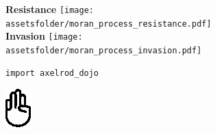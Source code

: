 \documentclass{beamer}
\newcommand{\assetsfolder}{./assets}
\newcommand{\researchfolder}{$HOME/rsc/axelrod-moran}
\newcommand{\mlresearchfolder}{$HOME/rsc/ml-paper}
\begin{document}


\begin{frame}
    \begin{center}
        \scalebox{.6}{}
    \end{center}
\end{frame}


\begin{frame}

    \begin{center}
        \textbf{Resistance}
        \texttt{[image: \\assetsfolder/moran\_process\_resistance.pdf]}\\

        \textbf{Invasion}
        \texttt{[image: \\assetsfolder/moran\_process\_invasion.pdf]}
    \end{center}
\end{frame}


\begin{frame}
    \scalebox{.7}{
        
    }
\end{frame}

\begin{frame}[fragile]{}

    \begin{center}
        \begin{minipage}{0.8\textwidth}
            \begin{verbatim}
import axelrod_dojo
            \end{verbatim}
        \end{minipage}
    \end{center}
\end{frame}


\begin{frame}
    \begin{center}
        \scalebox{.7}{
            
        }
    \end{center}
\end{frame}


\begin{frame}
    \begin{center}
        \includegraphics[height=.8\textheight]{./assets/hunger-games-hand-gesture.eps}


        \tiny
        \vfill
    \end{center}
\end{frame}
\end{document}
